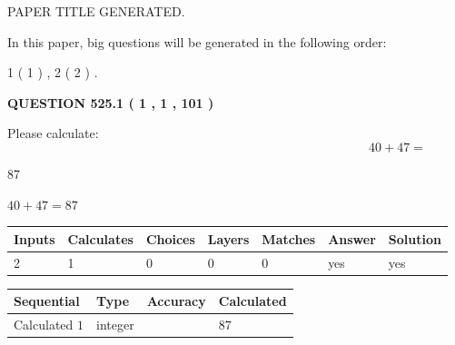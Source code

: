 \documentclass[12pt]{article}
\begin{document}
   
 PAPER TITLE GENERATED.
   
   
   
\vspace{0.2in}
   
In this paper, big questions will be generated in the following order: 
   
   
   1 ( 1 )
 ,
   2 ( 2 )
 .
  
\vspace{0.2in}
  
{\textbf{\Large{QUESTION
525.1 
 ( 1 , 1 , 101 )
}}}
  
  
 
Please calculate:
\begin{equation}
40 +  %
47 = \nonumber
\end{equation}
 
 
 
\noindent{}
 
 

87
 
 
\noindent{}
 
 

 
 
 
\noindent{}
 
 

$ %
40 +  %
47=   %
87$
 
 
\noindent{}
 
 

 
   
   
   
   
\noindent\begin{tabular}{|l|l|l|l|l|l|l|}
 \hline
Inputs & Calculates & Choices & Layers & Matches & Answer & Solution \\ \hline
 2  & 
 1  & 
 0
  & 
 0  & 
 0  & 
  yes & 
  yes 
  \\ \hline
 \end{tabular}
   
   
   
   
\noindent{}
   
   
  
  
\noindent\begin{tabular}{|l|l|l|l|}
\hline
 Sequential & Type & Accuracy & Calculated \\ 
\hline
 
 
  Calculated $  1 $ & integer &  & 
  $ 87 $ 
 \\  \hline  
 \end{tabular}
   
\end{document}
